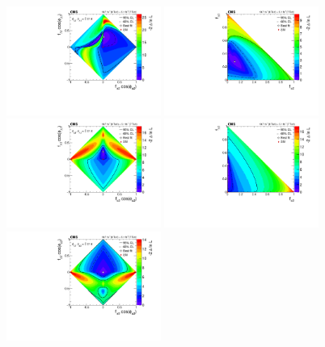 \begin{figure}
\centering
	\includegraphics[width=0.45\textwidth]{Spin_Parity/fL1_vs_fa2_Real.pdf}
	\includegraphics[width=0.45\textwidth]{Spin_Parity/fL1_vs_fa2_Profile.pdf} \\
	\includegraphics[width=0.45\textwidth]{Spin_Parity/fL1_vs_fa3_Real.pdf}
	\includegraphics[width=0.45\textwidth]{Spin_Parity/fL1_vs_fa3_Profile.pdf}  \\
	\includegraphics[width=0.45\textwidth]{Spin_Parity/fa2_vs_fa3_Real.pdf}

\end{figure}
